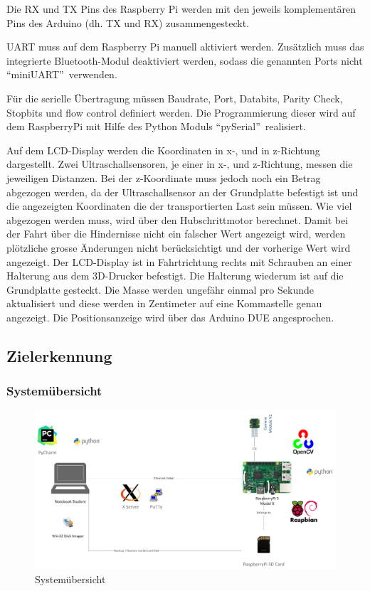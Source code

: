 \documentclass[a4paper]{report}
\begin{document}
Die RX und TX Pins des Raspberry Pi werden mit den jeweils komplementären Pins des Arduino (dh. TX und RX) zusammengesteckt.

UART muss auf dem Raspberry Pi manuell aktiviert werden.  Zusätzlich muss das integrierte Bluetooth-Modul deaktiviert werden, sodass die genannten Ports nicht \textquotedblleft miniUART\textquotedblright\ verwenden.

Für die serielle Übertragung müssen Baudrate, Port, Databits, Parity Check, Stopbits und flow control definiert werden. Die Programm\-ierung dieser wird auf dem RaspberryPi mit Hilfe des Python Moduls \textquotedblleft pySerial\textquotedblright\ realisiert.

Auf dem LCD-Display werden die Koordinaten in x-, und in z-Richtung dargestellt. Zwei Ultraschallsensoren, je einer in x-, und z-Richtung, messen die jeweiligen Distanzen. Bei der z-Koordinate muss jedoch noch ein Betrag abgezogen werden, da der Ultraschallsensor an der Grundplatte befestigt ist und die angezeigten Koordinaten die der transportierten Last sein müssen. Wie viel abgezogen werden muss, wird über den Hubschrittmotor berechnet. Damit bei der Fahrt über die Hindernisse nicht ein falscher Wert angezeigt wird, werden plötzliche grosse Änderungen nicht berücksichtigt und der vorherige Wert wird angezeigt. Der LCD-Display ist in Fahrtrichtung rechts mit Schrauben an einer Halterung aus dem 3D-Drucker befestigt. Die Halterung wiederum ist auf die Grundplatte gesteckt. Die Masse werden ungefähr einmal pro Sekunde aktualisiert und diese werden in Zentimeter auf eine Kommastelle genau angezeigt. Die Positionsanzeige wird über das Arduino DUE angesprochen.

\subsection{Zielerkennung}
\label{ssec:Zielerkennung}
\subsubsection{Systemübersicht}
\label{sssec:Systemuebersicht}

\begin{figure}[h!]
	\includegraphics[keepaspectratio,width=\textwidth]{TargetRecOS}
	\caption{Systemübersicht}
	\label{fig:Systemuebersicht}
\end{figure}
\end{document}
